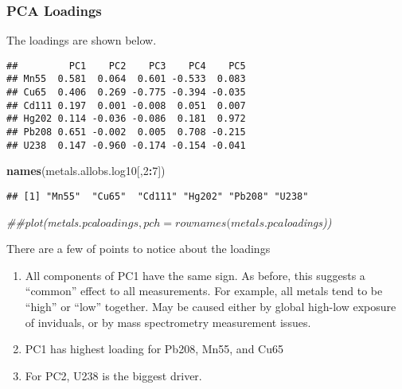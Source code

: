 \documentclass[]{article}
\newenvironment{Shaded}{\begin{snugshade}}{\end{snugshade}}
\newcommand{\CommentTok}[1]{\textcolor[rgb]{0.56,0.35,0.01}{\textit{#1}}}
\newcommand{\DecValTok}[1]{\textcolor[rgb]{0.00,0.00,0.81}{#1}}
\newcommand{\KeywordTok}[1]{\textcolor[rgb]{0.13,0.29,0.53}{\textbf{#1}}}
\newcommand{\NormalTok}[1]{#1}
\newcommand{\OperatorTok}[1]{\textcolor[rgb]{0.81,0.36,0.00}{\textbf{#1}}}
\begin{document}
\hypertarget{pca-loadings}{%
\subsubsection{PCA Loadings}\label{pca-loadings}}

The loadings are shown below.

\begin{Shaded}
\end{Shaded}

\begin{verbatim}
##         PC1    PC2    PC3    PC4    PC5
## Mn55  0.581  0.064  0.601 -0.533  0.083
## Cu65  0.406  0.269 -0.775 -0.394 -0.035
## Cd111 0.197  0.001 -0.008  0.051  0.007
## Hg202 0.114 -0.036 -0.086  0.181  0.972
## Pb208 0.651 -0.002  0.005  0.708 -0.215
## U238  0.147 -0.960 -0.174 -0.154 -0.041
\end{verbatim}

\begin{Shaded}
\begin{Highlighting}[]
\KeywordTok{names}\NormalTok{(metals.allobs.log10[,}\DecValTok{2}\OperatorTok{:}\DecValTok{7}\NormalTok{])}
\end{Highlighting}
\end{Shaded}

\begin{verbatim}
## [1] "Mn55"  "Cu65"  "Cd111" "Hg202" "Pb208" "U238"
\end{verbatim}

\begin{Shaded}
\begin{Highlighting}[]
\CommentTok{##plot(metals.pca$loadings, pch=rownames(metals.pca$loadings))}
\end{Highlighting}
\end{Shaded}

There are a few of points to notice about the loadings

\begin{enumerate}
\def\labelenumi{\arabic{enumi}.}
\item
  All components of PC1 have the same sign. As before, this suggests a
  ``common'' effect to all measurements. For example, all metals tend to
  be ``high'' or ``low'' together. May be caused either by global
  high-low exposure of inviduals, or by mass spectrometry measurement
  issues.
\item
  PC1 has highest loading for Pb208, Mn55, and Cu65
\item
  For PC2, U238 is the biggest driver.
\end{enumerate}
\end{document}

